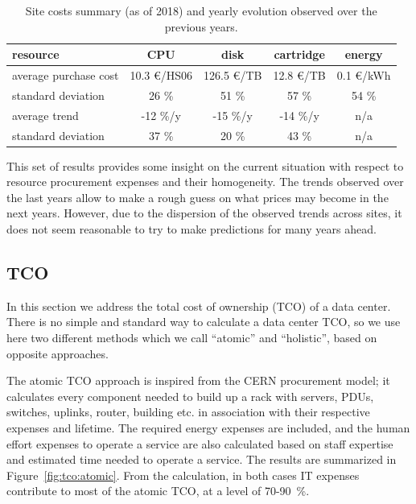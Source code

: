\begin{table}[h]
    \centering
    \caption{Site costs summary (as of 2018) and yearly evolution observed over the previous years.}
    \label{tab:sitecosts}
    \begin{tabular}{l|cccc}
        \hline
        resource & CPU & disk & cartridge & energy \\\hline
        average purchase cost & 10.3 \euro/HS06 & 126.5 \euro/TB & 12.8 \euro/TB & 0.1 \euro/kWh\\\hline
        standard deviation & 26 \% & 51 \% & 57 \% & 54 \% \\\hline
        average trend & -12 \%/y & -15 \%/y & -14 \%/y & n/a \\\hline
        standard deviation & 37 \% & 20 \% & 43 \% & n/a \\\hline
    \end{tabular}
\end{table}


This set of results provides some insight on the current situation
with respect to resource procurement expenses and their
homogeneity. The trends observed over the last years allow to make a
rough guess on what prices may become in the next years. However, due
to the dispersion of the observed trends across sites, it does not seem
reasonable to try to make predictions for many years ahead.

\subsection{\label{sec:sitecost:tco}TCO}

In this section we address the total cost of ownership (TCO) of a data
center.  There is no simple and standard way to calculate a data
center TCO, so we use here two different methods which we call
``atomic'' and ``holistic'', based on opposite approaches.

The atomic TCO approach is inspired from the CERN procurement model;
it calculates every component needed to build up a rack with servers,
PDUs, switches, uplinks, router, building etc. in association with
their respective expenses and lifetime.  The required energy expenses
are included, and the human effort expenses to operate a service are
also calculated based on staff expertise and estimated time needed to
operate a service.  The results are summarized in
Figure~\ref{fig:tco:atomic}.  From the calculation, in both cases IT
expenses contribute to most of the atomic TCO, at a level of 70-90~\%.


